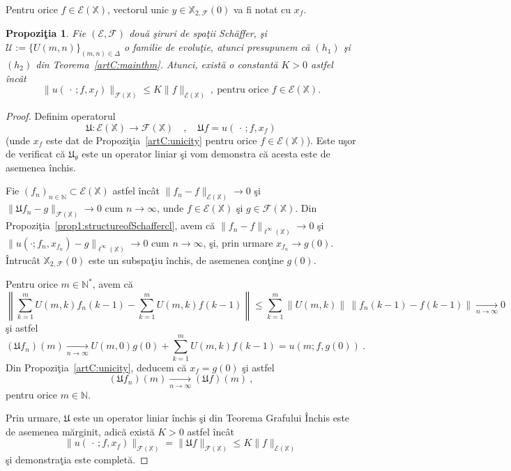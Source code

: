 \documentclass[ a4paper, 12pt]{report}
\newcommand{\E}{\mathcal{E}}
\newcommand{\F}{\mathcal{F}}
\newcommand{\N}{\mathbb{N}}
\newcommand{\X}{\mathbb{X}}
\newtheorem{prop}[theorem]{\bf Propozi\c tia }
\theoremstyle{definition}
\theoremstyle{remark}
\numberwithin{equation}{section}
\begin{document}
Pentru orice $f\in\E(\X)$, vectorul unic $y\in\X_{2,\F}(0)$ va fi notat cu $x_{f}$.


\begin{prop}
\label{artC:boundedness}
Fie $(\E,\F)$ dou\u a \c siruri de spa\c tii Sch\"{a}ffer, \c si $\mathcal{U}:=\{U(m,n)\}_{(m,n)\in\Delta}$ o familie de evolu\c tie, atunci presupunem c\u a $(h_1)$ \c si $(h_2)$ din Teorema~\ref{artC:mainthm}. Atunci, exist\u a o constant\u a $K>0$ astfel \^inc\^at
$$\|u(\,\cdot\,;f,x_f)\|_{\F(\X)}\leq K\|f\|_{\E(\X)}\ ,\ \text{pentru orice } f\in\E(\X).$$
\end{prop}
\begin{proof}
Definim operatorul
$$\mathfrak{U}:\E(\X)\to\F(\X)\quad,\quad
  \mathfrak{U}f=u(\,\cdot\,;f,x_{f}) $$
(unde $x_f$ este dat de Propozi\c tia~\ref{artC:unicity} pentru orice $f\in\E(\X)$).
Este u\c sor de verificat c\u a $\mathfrak{U}_{\theta}$ este un operator liniar \c si
vom demonstra c\u a acesta este de asemenea \^inchis.

Fie $(f_n)_{n\in\N}\subset\E(\X)$ astfel \^inc\^at
$\|f_n-f\|_{\E(\X)}\to0$ \c si
$\|\mathfrak{U}f_n-g\|_{\F(\X)}\to0$ cum $n\to\infty$, unde
$f\in\E(\X)$ \c si $g\in\F(\X)$. Din Propozi\c tia~\ref{prop1:structureofSchaffercl}, avem c\u a
$\|f_n-f\|_{\ell^{\infty}(\X)}\to0$ \c si
$\|u(\cdot;f_n,x_{f_n})-g\|_{\ell^{\infty}(\X)}\to0$ cum $n\to\infty$,
\c si, prin urmare
$x_{f_n}\to g(0)$. \^Intruc\^at $\X_{2,\F}(0)$ este un subspa\c tiu \^inchis, de asemenea con\c tine $g(0)$.

Pentru orice $m\in\N^*$, avem c\u a
$$\left\|\sum_{k=1}^{m}U(m,k)f_n(k-1) - \sum_{k=1}^{m}U(m,k)f(k-1) \right\| \leq
 \sum_{k=1}^{m} \|U(m,k)\|\,\|f_n(k-1)-f(k-1)\| \xrightarrow[n\to\infty]{}0  $$
\c si astfel
$$(\mathfrak{U}f_n)(m) \xrightarrow[n\to\infty]{} U(m,0)g(0) + \sum_{k=1}^{m}U(m,k)f(k-1)= u(m;f,g(0))\ .$$
Din Propozi\c tia~\ref{artC:unicity}, deducem c\u a $x_f=g(0)$ \c si astfel
$$(\mathfrak{U}f_n)(m) \xrightarrow[n\to\infty]{} (\mathfrak{U}f)(m)\ ,$$
pentru orice $m\in\N$.

Prin urmare, $\mathfrak{U}$ este un operator liniar \^inchis \c si din
Teorema Grafului \^Inchis  este de asemenea m\u arginit, adic\u a exist\u a
$K>0$ astfel \^inc\^at
$$\|u(\,\cdot\,;f,x_{f})\|_{\F(\X)}=
  \|\mathfrak{U}f\|_{\F(\X)}\leq   K\|f\|_{\E(\X)}$$
\c si demonstra\c tia este complet\u a.
\end{proof}
\end{document}
